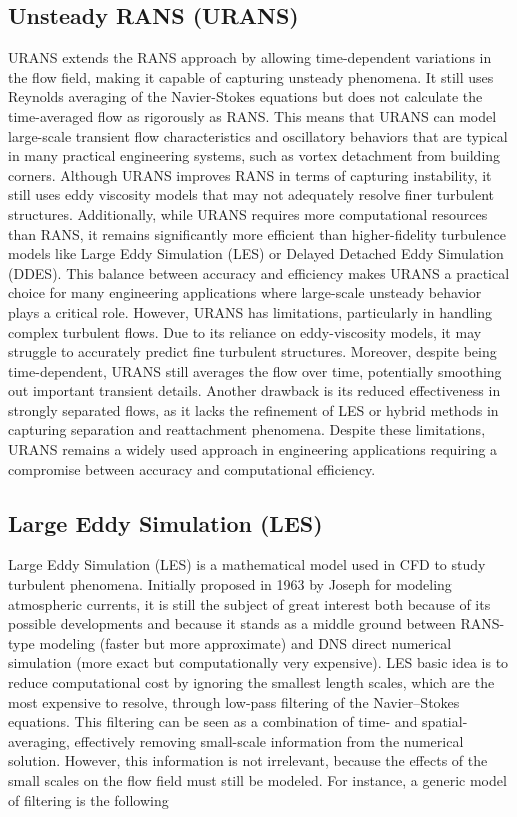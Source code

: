 \documentclass[a5paper]{sapthesis}
\begin{document}
	\subsection{Unsteady RANS (URANS)}
	URANS extends the RANS approach by allowing time-dependent variations in the flow field, making it capable of capturing unsteady phenomena. It still uses Reynolds averaging of the Navier-Stokes equations but does not calculate the time-averaged flow as rigorously as RANS. This means that URANS can model large-scale transient flow characteristics and oscillatory behaviors that are typical in many practical engineering systems, such as vortex detachment from building corners. Although URANS improves RANS in terms of capturing instability, it still uses eddy viscosity models that may not adequately resolve finer turbulent structures. Additionally, while URANS requires more computational resources than RANS, it remains significantly more efficient than higher-fidelity turbulence models like Large Eddy Simulation (LES) or Delayed Detached Eddy Simulation (DDES). This balance between accuracy and efficiency makes URANS a practical choice for many engineering applications where large-scale unsteady behavior plays a critical role. However, URANS has limitations, particularly in handling complex turbulent flows. Due to its reliance on eddy-viscosity models, it may struggle to accurately predict fine turbulent structures. Moreover, despite being time-dependent, URANS still averages the flow over time, potentially smoothing out important transient details. Another drawback is its reduced effectiveness in strongly separated flows, as it lacks the refinement of LES or hybrid methods in capturing separation and reattachment phenomena. Despite these limitations, URANS remains a widely used approach in engineering applications requiring a compromise between accuracy and computational efficiency.

	\subsection{Large Eddy Simulation (LES)}
 	Large Eddy Simulation (LES) is a mathematical model used in CFD to  study turbulent phenomena. Initially proposed in 1963 by Joseph \citet{smagorinsky1963general} for modeling atmospheric currents, it is still the subject of great interest both because of its possible developments and because it stands as a middle ground between RANS-type modeling (faster but more approximate) and DNS direct numerical simulation (more exact but computationally very expensive). LES basic idea is to reduce computational cost by ignoring the smallest length scales, which are the most expensive to resolve, through low-pass filtering of the Navier–Stokes equations. This filtering can be seen as a combination of time- and spatial-averaging, effectively removing small-scale information from the numerical solution. However, this information is not irrelevant, because the effects of the small scales on the flow field must still be modeled.
 	For instance, a generic model of filtering is the following
 	
\end{document}
